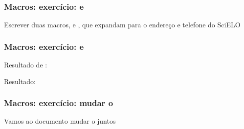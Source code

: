 \begin{frame}
  \frametitle{Macros: exercício: \latexcode{\address} e \latexcode{\telephone}}
  \LARGE
  Escrever duas macros, \latexcode{\address} e \latexcode{\telephone}, que
  expandam para o endereço e telefone do SciELO
\end{frame}

\begin{frame}
  \frametitle{Macros: exercício: \latexcode{\email} e \latexcode{\todo}}
  \LARGE
  Resultado de \latexcode{\email}: 

  Resultado: 
\end{frame}

\begin{frame}
  \frametitle{Macros: exercício: mudar o \latexcode{\maketitle}}
  \LARGE
  Vamos ao documento mudar o \latexcode{\maketitle} juntos
\end{frame}
